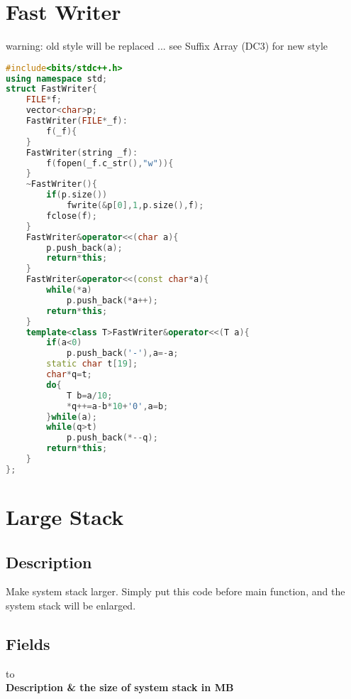\documentclass{book}
\begin{document}
\section{Fast Writer}
warning: old style will be replaced ... see Suffix Array (DC3) for new style\begin{lstlisting}[language=C++,title={Fast Writer.hpp (866 bytes, 39 lines)}]
#include<bits/stdc++.h>
using namespace std;
struct FastWriter{
    FILE*f;
    vector<char>p;
    FastWriter(FILE*_f):
        f(_f){
    }
    FastWriter(string _f):
        f(fopen(_f.c_str(),"w")){
    }
    ~FastWriter(){
        if(p.size())
            fwrite(&p[0],1,p.size(),f);
        fclose(f);
    }
    FastWriter&operator<<(char a){
        p.push_back(a);
        return*this;
    }
    FastWriter&operator<<(const char*a){
        while(*a)
            p.push_back(*a++);
        return*this;
    }
    template<class T>FastWriter&operator<<(T a){
        if(a<0)
            p.push_back('-'),a=-a;
        static char t[19];
        char*q=t;
        do{
            T b=a/10;
            *q++=a-b*10+'0',a=b;
        }while(a);
        while(q>t)
            p.push_back(*--q);
        return*this;
    }
};
\end{lstlisting}
\section{Large Stack}

\subsection*{Description}

Make system stack larger. Simply put this code before main function, and the system stack will be enlarged.

\subsection*{Fields}

\begin{tabu} to \textwidth {|X|X|}
\hline
{}\\
\hline
\bfseries{Description} & the size of system stack in MB\\
\hline
\end{tabu}
\end{document}
